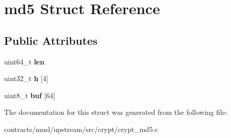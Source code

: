 \hypertarget{structmd5}{}\section{md5 Struct Reference}
\label{structmd5}
\subsection*{Public Attributes}
\begin{DoxyCompactItemize}
\item 
\mbox{\label{structmd5_abd4b3ff9f871b13aa26de066ec087b28}} 
uint64\+\_\+t {\bfseries len}
\item 
\mbox{\label{structmd5_af05dd238b5d6934b1bfcd3dfcf5ad889}} 
uint32\+\_\+t {\bfseries h} \mbox{[}4\mbox{]}
\item 
\mbox{\label{structmd5_a0ca41709ef50fd30c16aefabc38b6b8d}} 
uint8\+\_\+t {\bfseries buf} \mbox{[}64\mbox{]}
\end{DoxyCompactItemize}


The documentation for this struct was generated from the following file\+:\begin{DoxyCompactItemize}
\item 
contracts/musl/upstream/src/crypt/crypt\+\_\+md5.\+c\end{DoxyCompactItemize}
